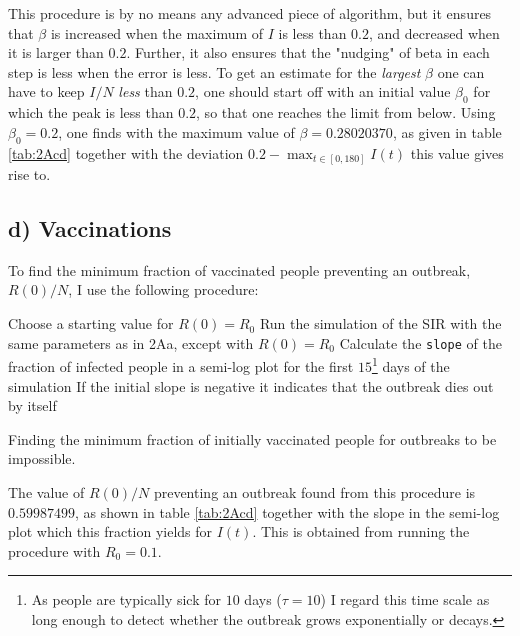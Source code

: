 This procedure is by no means any advanced piece of algorithm, but it ensures that $\beta$ is increased when the maximum of $I$ is less than $0.2$, and decreased when it is larger than $0.2$. Further, it also ensures that the "nudging" of beta in each step is less when the error is less. To get an estimate for the \textit{largest} $\beta$ one can have to keep $I/N$ \textit{less} than $0.2$, one should start off with an initial value $\beta_0$ for which the peak is less than $0.2$, so that one reaches the limit from below. Using $\beta_0 = 0.2$, one finds with the maximum value of $\beta = 0.28020370$, as given in table \ref{tab:2Acd} together with the deviation $0.2 - \max_{t\in[0,180]} I(t)$ this value gives rise to.  



\subsection{d) Vaccinations}

To find the minimum fraction of vaccinated people preventing an outbreak, $R(0)/N$, I use the following procedure:

\begin{algorithm}[H]
	Choose a starting value for $R(0) = R_0$\;
	Run the simulation of the SIR with the same parameters as in 2Aa, except with $R(0) = R_0$ \;
	Calculate the \texttt{slope} of the fraction of infected people in a semi-log plot for the first $15$\footnote{As people are typically sick for $10$ days ($\tau = 10$) I regard this time scale as long enough to detect whether the outbreak grows exponentially or decays.} days of the simulation\;
	If the initial slope is negative it indicates that the outbreak dies out by itself\;
	\caption{Finding the minimum fraction of initially vaccinated people for outbreaks to be impossible.}
\end{algorithm} 

The value of $R(0)/N$ preventing an outbreak found from this procedure is $0.59987499$, as shown in table \ref{tab:2Acd} together with the slope in the semi-log plot which this fraction yields for $I(t)$. This is obtained from running the procedure with $R_0 = 0.1$.

